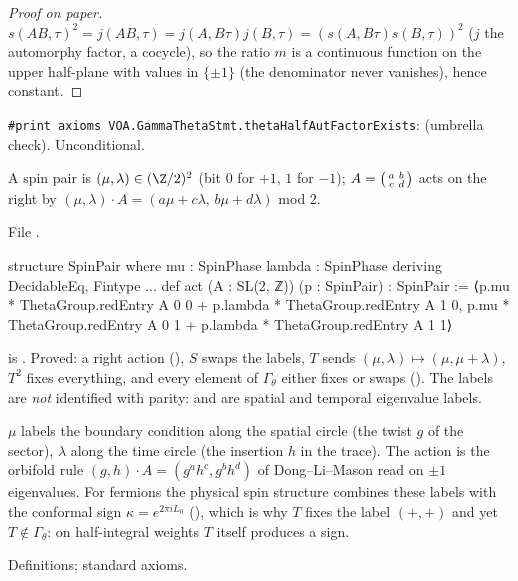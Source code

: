 \begin{proof}[Proof on paper]
$s(AB,\tau)^2=j(AB,\tau)=j(A,B\tau)j(B,\tau)=(s(A,B\tau)s(B,\tau))^2$ ($j$ the automorphy factor, a
cocycle), so the ratio $m$ is a continuous function on the upper half-plane with values in $\{\pm1\}$
(the denominator never vanishes), hence constant.
\end{proof}
\begin{status}
\texttt{\#print axioms VOA.GammaThetaStmt.thetaHalfAutFactorExists}:  (umbrella check). Unconditional.
\end{status}

\begin{definition}\label{l17:def:spinpair}
A spin pair is $(\mu,\lambda)\in(\Z/2)^2$ (bit $0$ for $+1$, $1$ for $-1$); $A=\begin{psmallmatrix}a&b\\c&d\end{psmallmatrix}$
acts on the right by $(\mu,\lambda)\cdot A=(a\mu+c\lambda,\,b\mu+d\lambda)$ mod $2$.
\end{definition}
\noindent File .
\begin{leancode}
structure SpinPair where
  mu : SpinPhase
  lambda : SpinPhase
deriving DecidableEq, Fintype
...
def act (A : SL(2, ℤ)) (p : SpinPair) : SpinPair :=
  ⟨p.mu * ThetaGroup.redEntry A 0 0 + p.lambda * ThetaGroup.redEntry A 1 0,
   p.mu * ThetaGroup.redEntry A 0 1 + p.lambda * ThetaGroup.redEntry A 1 1⟩
\end{leancode}
\begin{dictionary}
 is . Proved: a right action (), $S$ swaps the labels,
$T$ sends $(\mu,\lambda)\mapsto(\mu,\mu+\lambda)$, $T^2$ fixes everything, and every element of
$\Gamma_\theta$ either fixes or swaps (). The labels are \emph{not}
identified with parity:  and  are spatial and temporal eigenvalue labels.
\end{dictionary}
\begin{physics}
$\mu$ labels the boundary condition along the spatial circle (the twist $g$ of the sector), $\lambda$
along the time circle (the insertion $h$ in the trace). The action is the orbifold rule
$(g,h)\cdot A=(g^ah^c,g^bh^d)$ of Dong--Li--Mason read on $\pm1$ eigenvalues. For fermions the physical
spin structure combines these labels with the conformal sign $\kappa=e^{2\pi iL_0}$ (),
which is why $T$ fixes the label $(+,+)$ and yet $T\notin\Gamma_\theta$: on half-integral weights $T$
itself produces a sign.
\end{physics}
\begin{status}
Definitions; standard axioms.
\end{status}

